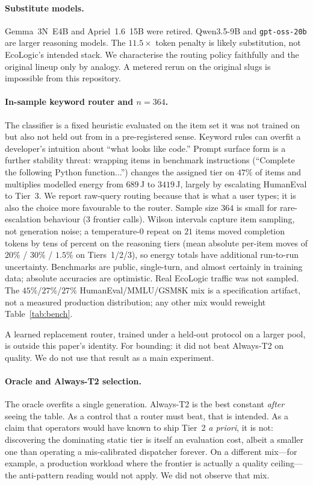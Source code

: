\documentclass[10pt,conference]{IEEEtran}
\begin{document}
\paragraph{Substitute models.}
Gemma~3N~E4B and Apriel~1.6~15B were retired. Qwen3.5-9B and \texttt{gpt-oss-20b} are larger reasoning models. The $11.5\times$ token penalty is likely substitution, not EcoLogic's intended stack. We characterise the routing policy faithfully and the original lineup only by analogy. A metered rerun on the original slugs is impossible from this repository.

\paragraph{In-sample keyword router and $n=364$.}
The classifier is a fixed heuristic evaluated on the item set it was not trained on but also not held out from in a pre-registered sense. Keyword rules can overfit a developer's intuition about ``what looks like code.'' Prompt surface form is a further stability threat: wrapping items in benchmark instructions (``Complete the following Python function...'') changes the assigned tier on $47\%$ of items and multiplies modelled energy from $689$\,J to $3419$\,J, largely by escalating HumanEval to Tier~3. We report raw-query routing because that is what a user types; it is also the choice more favourable to the router. Sample size $364$ is small for rare-escalation behaviour ($3$ frontier calls). Wilson intervals capture item sampling, not generation noise; a temperature-$0$ repeat on $21$ items moved completion tokens by tens of percent on the reasoning tiers (mean absolute per-item moves of $20\%$ / $30\%$ / $1.5\%$ on Tiers~1/2/3), so energy totals have additional run-to-run uncertainty. Benchmarks are public, single-turn, and almost certainly in training data; absolute accuracies are optimistic. Real EcoLogic traffic was not sampled. The $45\%$/$27\%$/$27\%$ HumanEval/MMLU/GSM8K mix is a specification artifact, not a measured production distribution; any other mix would reweight Table~\ref{tab:bench}.

A learned replacement router, trained under a held-out protocol on a larger pool, is outside this paper's identity. For bounding: it did not beat Always-T2 on quality. We do not use that result as a main experiment.

\paragraph{Oracle and Always-T2 selection.}
The oracle overfits a single generation. Always-T2 is the best constant \emph{after} seeing the table. As a control that a router must beat, that is intended. As a claim that operators would have known to ship Tier~2 \emph{a priori}, it is not: discovering the dominating static tier is itself an evaluation cost, albeit a smaller one than operating a mis-calibrated dispatcher forever. On a different mix---for example, a production workload where the frontier is actually a quality ceiling---the anti-pattern reading would not apply. We did not observe that mix.
\end{document}
